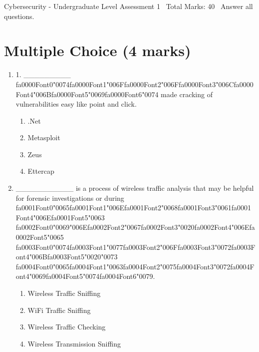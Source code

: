 \documentclass[12pt]{article}
\begin{document}
\begin{center}
Cybersecurity - Undergraduate Level Assessment 1 \
Total Marks: 40 \
Answer all questions.
\end{center}

\section*{Multiple Choice (4 marks)}
\begin{enumerate}[label=\arabic*.]
\item 1. \_\_\_\_\_\_\_\_\_ {\csname fa0000Font0\endcsname\char"0074}{\csname fa0000Font1\endcsname\char"006F}{\csname fa0000Font2\endcsname\char"006F}{\csname fa0000Font3\endcsname\char"006C}{\csname fa0000Font4\endcsname\char"006B}{\csname fa0000Font5\endcsname\char"0069}{\csname fa0000Font6\endcsname\char"0074} made cracking of vulnerabilities easy like point and click.
\begin{enumerate}[label=(\alph*)]
    \item .Net
    \item Metasploit
    \item Zeus
    \item Ettercap
\end{enumerate}
\item \_\_\_\_\_\_\_\_\_\_\_ is a process of wireless traffic analysis that may be helpful for forensic investigations or during {\csname fa0001Font0\endcsname\char"0065}{\csname fa0001Font1\endcsname\char"006E}{\csname fa0001Font2\endcsname\char"0068}{\csname fa0001Font3\endcsname\char"0061}{\csname fa0001Font4\endcsname\char"006E}{\csname fa0001Font5\endcsname\char"0063} {\csname fa0002Font0\endcsname\char"0069}{\char"006E}{\csname fa0002Font2\endcsname\char"0067}{\csname fa0002Font3\endcsname\char"0020}{\csname fa0002Font4\endcsname\char"006E}{\csname fa0002Font5\endcsname\char"0065} {\csname fa0003Font0\endcsname\char"0074}{\csname fa0003Font1\endcsname\char"0077}{\csname fa0003Font2\endcsname\char"006F}{\csname fa0003Font3\endcsname\char"0072}{\csname fa0003Font4\endcsname\char"006B}{\csname fa0003Font5\endcsname\char"0020}{\char"0073} {\csname fa0004Font0\endcsname\char"0065}{\csname fa0004Font1\endcsname\char"0063}{\csname fa0004Font2\endcsname\char"0075}{\csname fa0004Font3\endcsname\char"0072}{\csname fa0004Font4\endcsname\char"0069}{\csname fa0004Font5\endcsname\char"0074}{\csname fa0004Font6\endcsname\char"0079}.
\begin{enumerate}[label=(\alph*)]
    \item Wireless Traffic Sniffing
    \item WiFi Traffic Sniffing
    \item Wireless Traffic Checking
    \item Wireless Transmission Sniffing
\end{enumerate}
\end{enumerate}
\end{document}
